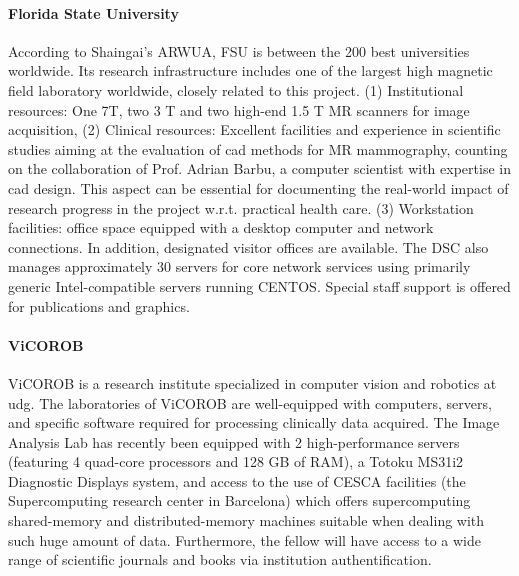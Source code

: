\paragraph{Florida State University} 
According to Shaingai's ARWUA, FSU is between the 200 best universities worldwide. 
Its research infrastructure includes one of the largest high magnetic field laboratory worldwide, closely related to this project. 
(1) Institutional resources: One 7T, two 3 T and two high-end 1.5 T MR scanners for image acquisition, (2) Clinical resources: Excellent facilities and experience in scientific studies aiming at the evaluation of \ac{cad} methods for MR mammography, counting on the collaboration of Prof. Adrian Barbu, a computer scientist with expertise in \ac{cad} design. 
This aspect can be essential for documenting the real-world impact of research progress in the project w.r.t. practical health care. 
(3) Workstation facilities: office space equipped with a desktop computer and network connections. 
In addition, designated visitor offices are available. 
The DSC also manages approximately 30 servers for core network services using primarily generic Intel-compatible servers running CENTOS. 
Special staff support is offered for publications and graphics.

\paragraph{ViCOROB}
ViCOROB is a research institute specialized in computer vision and robotics at \ac{udg}.
The laboratories of ViCOROB are well-equipped with computers, servers, and specific software required for processing clinically data acquired. 
The Image Analysis Lab has recently been equipped with 2 high-performance servers (featuring 4 quad-core processors and 128 GB of RAM), a Totoku MS31i2 Diagnostic Displays system, and access to the use of CESCA facilities (the Supercomputing research center in Barcelona) which offers supercomputing shared-memory and distributed-memory machines suitable when dealing with such huge amount of data.
Furthermore, the fellow will have access to a wide range of scientific journals and books via institution authentification.

